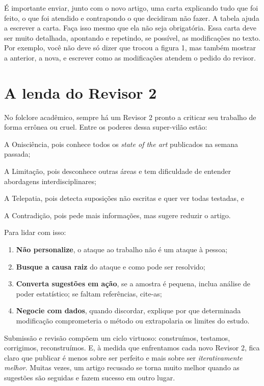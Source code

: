 É importante enviar, junto com o novo artigo, uma carta explicando tudo que foi feito, o que foi atendido e contrapondo o que decidiram não fazer. 
A tabela ajuda a escrever a carta. 
Faça isso mesmo que ela não seja obrigatória. 
Essa carta deve ser muito detalhada, apontando e repetindo, se possível, as modificações no texto. 
Por exemplo, você não deve só dizer que trocou a figura 1, mas também mostrar a anterior, a nova, e escrever como as modificações atendem o pedido do revisor.



 \section{A lenda do Revisor 2}

No folclore acadêmico, sempre há um Revisor 2 pronto a criticar seu trabalho de forma errônea ou cruel. Entre os poderes dessa super-vilão estão:
\begin{description}
  \item A Onisciência, pois conhece todos os \emph{state of the art} publicados na semana passada;
  \item A Limitação, pois desconhece outras áreas e tem dificuldade de entender abordagens interdisciplinares;
  \item A Telepatia, pois detecta suposições não escritas e quer ver todas testadas, e 
  \item A Contradição, pois pede mais informações, mas sugere reduzir o artigo.
\end{description}

Para lidar com isso:
\begin{enumerate}
  \item \textbf{Não personalize}, o ataque ao trabalho não é um        ataque à pessoa;
  \item \textbf{Busque a causa raiz} do ataque e como pode ser resolvido;
  \item \textbf{Converta sugestões em ação}, se a amostra é pequena,    inclua análise de poder estatístico; se faltam referências, cite-as;
  \item \textbf{Negocie com dados}, quando discordar,
        explique por que determinada modificação comprometeria o método ou extrapolaria os limites do estudo.
\end{enumerate}

Submissão e revisão compõem um ciclo virtuoso: 
construímos, testamos, corrigimos, reconstruímos.  
E, à medida que enfrentamos cada novo Revisor 2, fica claro que
publicar é menos sobre ser perfeito e mais sobre ser 
\emph{iterativamente melhor}. Muitas vezes, um artigo recusado se torna muito melhor quando as sugestões são seguidas e fazem sucesso em outro lugar.

